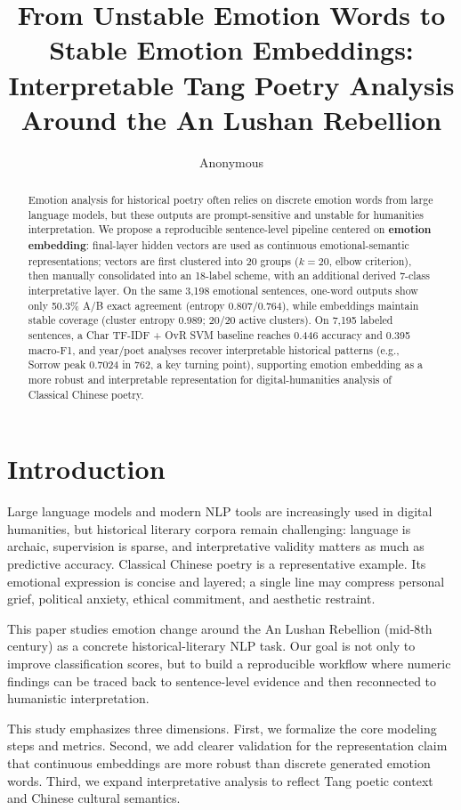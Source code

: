 \documentclass[11pt]{article}
\title{From Unstable Emotion Words to Stable Emotion Embeddings:\\Interpretable Tang Poetry Analysis Around the An Lushan Rebellion}
\author{Anonymous}
\begin{document}
\maketitle

\begin{abstract}
Emotion analysis for historical poetry often relies on discrete emotion words from large language models, but these outputs are prompt-sensitive and unstable for humanities interpretation.
We propose a reproducible sentence-level pipeline centered on \textbf{emotion embedding}: final-layer hidden vectors are used as continuous emotional-semantic representations; vectors are first clustered into 20 groups (\(k=20\), elbow criterion), then manually consolidated into an 18-label scheme, with an additional derived 7-class interpretative layer.
On the same 3,198 emotional sentences, one-word outputs show only 50.3\% A/B exact agreement (entropy 0.807/0.764), while embeddings maintain stable coverage (cluster entropy 0.989; 20/20 active clusters).
On 7,195 labeled sentences, a Char TF-IDF + OvR SVM baseline reaches 0.446 accuracy and 0.395 macro-F1, and year/poet analyses recover interpretable historical patterns (e.g., Sorrow peak 0.7024 in 762, a key turning point), supporting emotion embedding as a more robust and interpretable representation for digital-humanities analysis of Classical Chinese poetry.
\end{abstract}

\section{Introduction}

Large language models and modern NLP tools are increasingly used in digital humanities, but historical literary corpora remain challenging: language is archaic, supervision is sparse, and interpretative validity matters as much as predictive accuracy.
Classical Chinese poetry is a representative example.
Its emotional expression is concise and layered; a single line may compress personal grief, political anxiety, ethical commitment, and aesthetic restraint.

This paper studies emotion change around the An Lushan Rebellion (mid-8th century) as a concrete historical-literary NLP task.
Our goal is not only to improve classification scores, but to build a reproducible workflow where numeric findings can be traced back to sentence-level evidence and then reconnected to humanistic interpretation.

This study emphasizes three dimensions.
First, we formalize the core modeling steps and metrics.
Second, we add clearer validation for the representation claim that continuous embeddings are more robust than discrete generated emotion words.
Third, we expand interpretative analysis to reflect Tang poetic context and Chinese cultural semantics.
\end{document}
